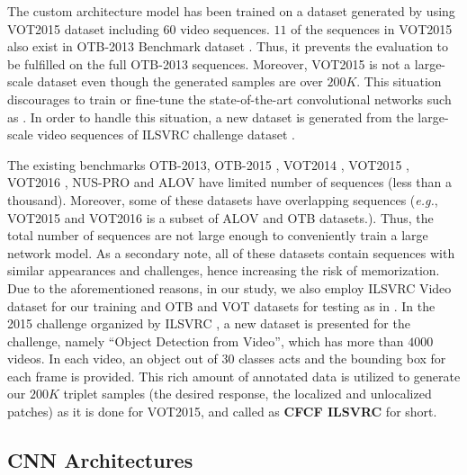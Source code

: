 \documentclass[journal]{IEEEtran}
\begin{document}
The custom architecture model has been trained on a dataset generated by using VOT2015 dataset including $60$ video sequences. $11$ of the sequences in VOT2015 also exist in OTB-2013 Benchmark dataset \cite{Benchmark2013}. Thus, it prevents the evaluation to be fulfilled on the full OTB-2013 sequences. Moreover, VOT2015 is not a large-scale dataset even though the generated samples are over $200K$. This situation discourages to train or fine-tune the state-of-the-art convolutional networks such as \cite{VGG, VGG_verydeep}. In order to handle this situation, a new dataset is generated from the large-scale video sequences of ILSVRC challenge dataset \cite{ILSVRC2015}. 

The existing benchmarks OTB-2013\cite{Benchmark2013}, OTB-2015 \cite{BenchmarkPAMI}, VOT2014 \cite{VOT2014}, VOT2015 \cite{VOT2015}, VOT2016 \cite{VOT2016}, NUS-PRO \cite{NUS-PRO} and ALOV \cite{ALOV} have limited number of sequences (less than a thousand). Moreover, some of these datasets have overlapping sequences (\emph{e.g.}, VOT2015 and VOT2016 is a subset of ALOV and OTB datasets.). Thus, the total number of  sequences are not large enough to conveniently train a large network model. As a secondary note, all of these datasets contain sequences with similar appearances and challenges, hence increasing the risk of memorization. Due to the aforementioned reasons, in our study, we also employ ILSVRC Video dataset for our training and OTB and VOT datasets for testing as in \cite{SiamFC}. In the 2015 challenge organized by ILSVRC \cite{ILSVRC2015}, a new dataset is presented for the challenge, namely ``Object Detection from Video'', which has more than $4000$ videos. In each video, an object out of $30$ classes acts and the bounding box for each frame is provided. This rich amount of annotated data is utilized to generate our $200K$ triplet samples (the desired response, the localized and unlocalized patches) as it is done for VOT2015, and called as \textbf{CFCF ILSVRC} for short.

  
\subsection{CNN Architectures}
\end{document}
